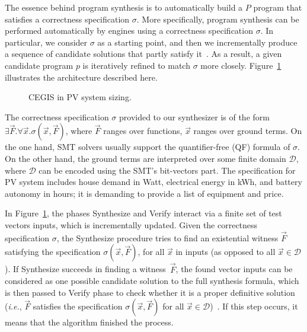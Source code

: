 \documentclass[journal]{IEEEtran}
\begin{document}
The essence behind program synthesis is to automatically build a $P$ program that satisfies a correctness specification $\sigma$. More specifically, program synthesis can be performed automatically by engines using a correctness specification $\sigma$. In particular, we consider $\sigma$ as a starting point, and then we incrementally produce a sequence of candidate solutions that partly satisfy it~\cite{Abateetal2017}. As a result, a given candidate program $p$ is iteratively refined to match $\sigma$ more closely. Figure~\ref{Counter-Example-Guided-Inductive-Synthesis} illustrates the architecture described here.
%
\begin{figure}[ht]
\begin{center}
\end{center}
	\caption{CEGIS in PV system sizing.}
	\label{Counter-Example-Guided-Inductive-Synthesis}
\end{figure}

The correctness specification $\sigma$ provided to our synthesizer is of the form $\exists \vec{F}. \forall \vec{x}. \sigma(\vec{x}, \vec{F})$, where $\vec{F}$ ranges over functions, $\vec{x}$ ranges over ground terms. On the one hand, SMT solvers usually support the quantifier-free (QF) formula of $\sigma$. On the other hand, the ground terms are interpreted over some finite domain $\mathcal{D}$, where $\mathcal{D}$ can be encoded using the SMT's bit-vectors part. The specification for PV system includes house demand in Watt, electrical energy in kWh, and battery autonomy in hours; it is demanding to provide a list of equipment and price.

In Figure~\ref{Counter-Example-Guided-Inductive-Synthesis}, the phases {\sc Synthesize} and {\sc Verify} interact via a finite set of test vectors {\sc inputs}, which is incrementally updated. Given the correctness specification $\sigma$, the {\sc Synthesize} procedure tries to find an existential witness $\vec{F}$ satisfying the specification $\sigma(\vec{x}, \vec{F})$, for all $\vec{x}$ in {\sc inputs} (as opposed to all $\vec{x} \in \mathcal{D}$). If {\sc Synthesize} succeeds in finding a witness~$\vec{F}$, the found vector {\sc inputs} can be considered as one possible candidate solution to the full synthesis formula, which is then passed to {\sc Verify} phase to check whether it is a proper definitive solution ({\it i.e.}, $\vec{F}$ satisfies the specification $\sigma(\vec{x}, \vec{F})$ for all $\vec{x}\in\mathcal{D}$)~\cite{iet-cps.2018.5006}. If this step occurs, it means that the algorithm finished the process. 
\end{document}
